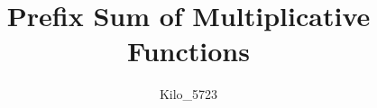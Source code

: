 \documentclass{book}
\title{Prefix Sum of Multiplicative Functions}
\author{Kilo\_5723}
\date{}
\begin{document}
\maketitle


\allowdisplaybreaks
\tableofcontents


\end{document}
